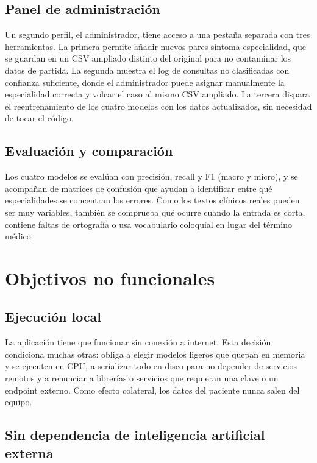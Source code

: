 \subsection{Panel de administración}

Un segundo perfil, el administrador, tiene acceso a una pestaña separada con tres herramientas. La primera permite añadir nuevos pares síntoma-especialidad, que se guardan en un CSV ampliado distinto del original para no contaminar los datos de partida. La segunda muestra el log de consultas no clasificadas con confianza suficiente, donde el administrador puede asignar manualmente la especialidad correcta y volcar el caso al mismo CSV ampliado. La tercera dispara el reentrenamiento de los cuatro modelos con los datos actualizados, sin necesidad de tocar el código.

\subsection{Evaluación y comparación}

Los cuatro modelos se evalúan con precisión, \gls{recall} y F1 (macro y micro), y se acompañan de matrices de confusión que ayudan a identificar entre qué especialidades se concentran los errores. Como los textos clínicos reales pueden ser muy variables, también se comprueba qué ocurre cuando la entrada es corta, contiene faltas de ortografía o usa vocabulario coloquial en lugar del término médico.

\section{Objetivos no funcionales}

\subsection{Ejecución local}

La aplicación tiene que funcionar sin conexión a internet. Esta decisión condiciona muchas otras: obliga a elegir modelos ligeros que quepan en memoria y se ejecuten en CPU, a serializar todo en disco para no depender de servicios remotos y a renunciar a librerías o servicios que requieran una clave o un endpoint externo. Como efecto colateral, los datos del paciente nunca salen del equipo.

\subsection{Sin dependencia de inteligencia artificial externa}

